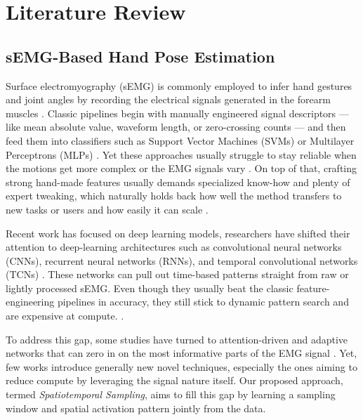 \chapter{Literature Review}
\label{chap:lr}

\section{sEMG-Based Hand Pose Estimation}

Surface electromyography (sEMG) is commonly employed to infer hand gestures and joint angles by recording the electrical signals generated in the forearm muscles \cite{oskoei2007myoelectric, simao2019review}. Classic pipelines begin with manually engineered signal descriptors — like mean absolute value, waveform length, or zero-crossing counts — and then feed them into classifiers such as Support Vector Machines (SVMs) or Multilayer Perceptrons (MLPs) \cite{oladazimi2012review, liu2007recognition}. Yet these approaches usually struggle to stay reliable when the motions get more complex or the EMG signals vary \cite{parajuli2019real}. On top of that, crafting strong hand-made features usually demands specialized know-how and plenty of expert tweaking, which naturally holds back how well the method transfers to new tasks or users and how easily it can scale \cite{atzori2016deep, oskoei2008support, phinyomark2018feature}.

Recent work has focused on deep learning models, researchers have shifted their attention to deep-learning architectures such as convolutional neural networks (CNNs), recurrent neural networks (RNNs), and temporal convolutional networks (TCNs) \cite{ameri2019regression, briouza2021convolutional, zhang2023lstm}. These networks can pull out time-based patterns straight from raw or lightly processed sEMG. Even though they usually beat the classic feature-engineering pipelines in accuracy, they still stick to dynamic pattern search and are expensive at compute. \cite{lee2022explainable}.

To address this gap, some studies have turned to attention-driven and adaptive networks that can zero in on the most informative parts of the EMG signal \cite{yang2025stcnet, hu2019semg}. Yet, few works introduce generally new novel techniques, especially the ones aiming to reduce compute by leveraging the signal nature itself. Our proposed approach, termed \textit{Spatiotemporal Sampling}, aims to fill this gap by learning a sampling window and spatial activation pattern jointly from the data.

